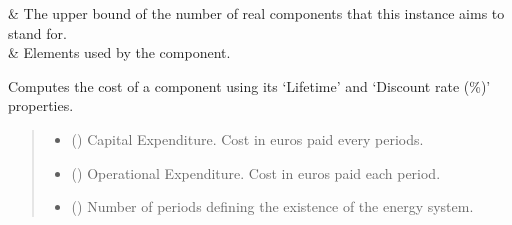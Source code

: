 \documentclass[letterpaper,10pt,english]{sphinxmanual}
\begin{document}
\begin{fulllineitems}
\begin{savenotes}
\begin{tabulary}{\linewidth}[t]{}
\hline
\sphinxAtStartPar
{\hyperref[\detokenize{generated/tamos.production.HeatExchanger:tamos.production.HeatExchanger.units_number_ub}]{}}
&
\sphinxAtStartPar
The upper bound of the number of real components that this instance aims to stand for.
\\
\hline
\sphinxAtStartPar
{\hyperref[\detokenize{generated/tamos.production.HeatExchanger:tamos.production.HeatExchanger.used_elements}]{}}
&
\sphinxAtStartPar
Elements used by the component.
\\
\hline
\end{tabulary}
\par
\sphinxattableend\end{savenotes}

\begin{fulllineitems}
\label{\detokenize{generated/tamos.production.HeatExchanger:tamos.production.HeatExchanger.compute_actualized_cost}}
\pysigstartsignatures
{}
\pysigstopsignatures
\sphinxAtStartPar
Computes the cost of a component using its ‘Lifetime’ and ‘Discount rate (\%)’ properties.
\begin{quote}\begin{description}
\begin{itemize}
\item {} 
\sphinxAtStartPar
{} () \textendash{} Capital Expenditure. Cost in euros paid every  periods.

\item {} 
\sphinxAtStartPar
{} () \textendash{} Operational Expenditure. Cost in euros paid each period.

\item {} 
\sphinxAtStartPar
{} () \textendash{} Number of periods defining the existence of the energy system.


\end{itemize}
\end{description}
\end{quote}
\end{fulllineitems}
\end{fulllineitems}
\end{document}
